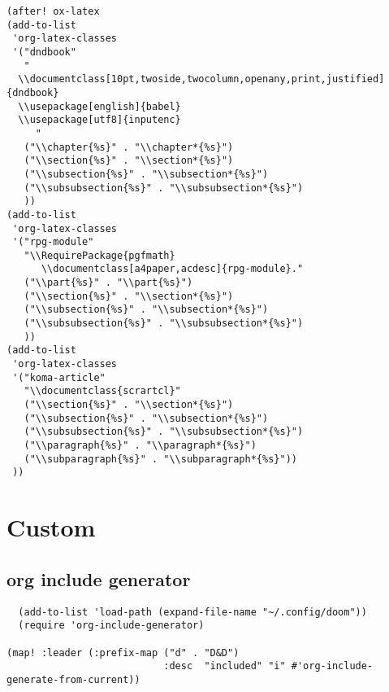 \documentclass[11pt]{article}
\begin{document}
\begin{verbatim}
(after! ox-latex
(add-to-list
 'org-latex-classes
 '("dndbook"
   "
  \\documentclass[10pt,twoside,twocolumn,openany,print,justified]{dndbook}
  \\usepackage[english]{babel}
  \\usepackage[utf8]{inputenc}
     "
   ("\\chapter{%s}" . "\\chapter*{%s}")
   ("\\section{%s}" . "\\section*{%s}")
   ("\\subsection{%s}" . "\\subsection*{%s}")
   ("\\subsubsection{%s}" . "\\subsubsection*{%s}")
   ))
(add-to-list
 'org-latex-classes
 '("rpg-module"
   "\\RequirePackage{pgfmath}
      \\documentclass[a4paper,acdesc]{rpg-module}."
   ("\\part{%s}" . "\\part{%s}")
   ("\\section{%s}" . "\\section*{%s}")
   ("\\subsection{%s}" . "\\subsection*{%s}")
   ("\\subsubsection{%s}" . "\\subsubsection*{%s}")
   ))
(add-to-list
 'org-latex-classes
 '("koma-article"
   "\\documentclass{scrartcl}"
   ("\\section{%s}" . "\\section*{%s}")
   ("\\subsection{%s}" . "\\subsection*{%s}")
   ("\\subsubsection{%s}" . "\\subsubsection*{%s}")
   ("\\paragraph{%s}" . "\\paragraph*{%s}")
   ("\\subparagraph{%s}" . "\\subparagraph*{%s}"))
 ))
\end{verbatim}
\section{Custom}
\label{sec:org2e3c16c}

\subsection{org include generator}
\label{sec:orgd741ffa}
\begin{verbatim}
  (add-to-list 'load-path (expand-file-name "~/.config/doom"))
  (require 'org-include-generator)

(map! :leader (:prefix-map ("d" . "D&D")
                           :desc  "included" "i" #'org-include-generate-from-current))
\end{verbatim}
\end{document}
